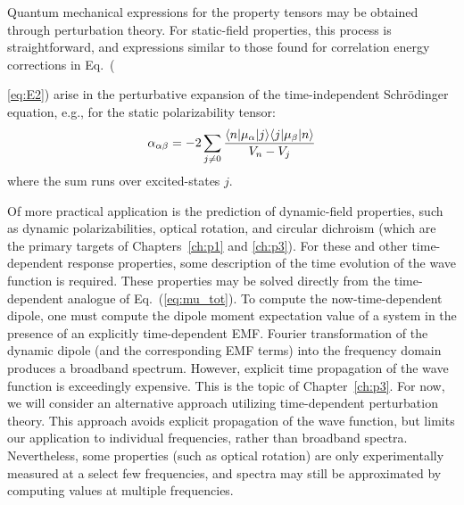 Quantum mechanical expressions for the property tensors may be obtained through perturbation theory. 
For static-field properties, this process is straightforward, and expressions similar to those found for
correlation energy corrections in Eq.~({\ref{eq:E2}) arise in the perturbative expansion of the time-independent Schr\"odinger
equation, e.g., for the static polarizability tensor:
\begin{equation} \label{eq:static_pol}
\alpha_{\alpha\beta} = -2\sum_{j\neq 0}\frac{\langle n |\mu_\alpha| j \rangle\langle j |\mu_\beta| n \rangle}{V_n - V_j} 
\end{equation}
where the sum runs over excited-states $j$.

Of more practical application is the prediction of dynamic-field properties, such as dynamic polarizabilities, 
optical rotation, and circular dichroism (which are the primary targets of Chapters~\ref{ch:p1}
and \ref{ch:p3}).
For these and other time-dependent response properties, some description of the time evolution of the wave function is
required. 
These properties may be solved directly from the time-dependent analogue of Eq.~(\ref{eq:mu_tot}). 
To compute the now-time-dependent dipole, one must compute the dipole moment expectation value of a system 
in the presence of an explicitly time-dependent EMF.
Fourier transformation of the dynamic dipole (and the corresponding EMF terms) 
into the frequency domain produces a broadband spectrum.
However, explicit time propagation of the wave function is exceedingly expensive.\cite{Goings2018} 
This is the topic of Chapter~\ref{ch:p3}. 
For now, we will consider an alternative approach utilizing time-dependent perturbation 
theory. This approach avoids explicit propagation of the wave function, but limits our
application to individual frequencies, rather than broadband spectra. Nevertheless, 
some properties (such as optical rotation) are only experimentally measured at a select few
frequencies, and spectra may still be approximated by computing values at 
multiple frequencies. 

}
